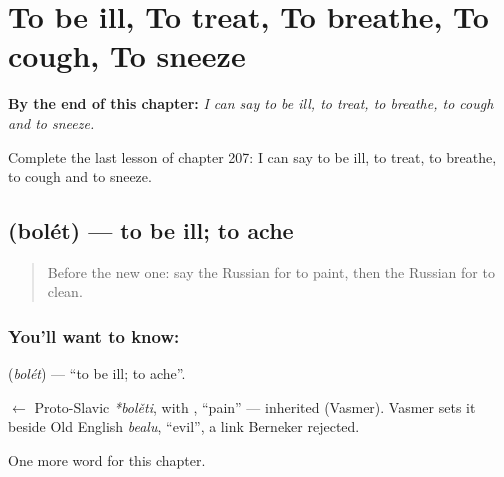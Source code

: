 
\chapter{To be ill, To treat, To breathe, To cough, To sneeze}
\label{ch:ru-to-be-ill-to-treat-to-breathe-to-cough-to-sneeze}

\begin{chapteropening}
\textbf{By the end of this chapter:} \emph{I can say to be ill, to treat, to breathe, to cough and to sneeze.}

Complete the last lesson of chapter 207: I can say to be ill, to treat, to breathe, to cough and to sneeze.
\end{chapteropening}

\section[\texorpdfstring{\ru{болеть} (bolét)}{болеть (bolét)}]{ (bolét) — to be ill; to ache}

\label{lesson:RU-C207-bolet}



\begin{quote}
Before the new one: say the Russian for to paint, then the Russian for to clean.
\end{quote}

\subsection*{You'll want to know: }
\textbf{} (\emph{bolét}) — \textquotedblleft{}to be ill; to ache\textquotedblright{}.

\begin{cousinweb}
\textbf{} $\leftarrow$ Proto-Slavic \emph{*bolěti}, with \emph{}, \textquotedblleft{}pain\textquotedblright{} — inherited (Vasmer). Vasmer sets it beside Old English \emph{bealu}, \textquotedblleft{}evil\textquotedblright{}, a link Berneker rejected.
\end{cousinweb}

\begin{grammarlens}[title={What you've built}]
One more word for this chapter.
\end{grammarlens}

